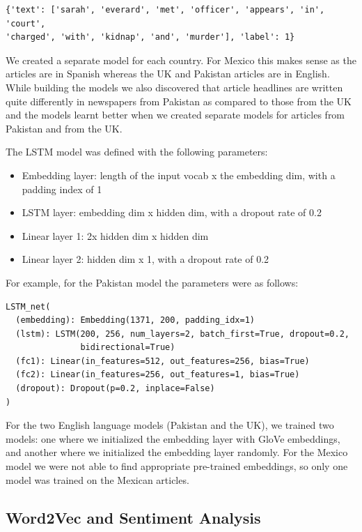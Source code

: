\documentclass{article}
\begin{document}
{{{\begin{verbatim}
{'text': ['sarah', 'everard', 'met', 'officer', 'appears', 'in', 'court',
'charged', 'with', 'kidnap', 'and', 'murder'], 'label': 1}    
\end{verbatim}

We created a separate model for each country. For Mexico this makes sense as the articles are in Spanish whereas the UK and Pakistan articles are in English. While building the models we also discovered that article headlines are written quite differently in newspapers from Pakistan as compared to those from the UK and the models learnt better when we created separate models for articles from Pakistan and from the UK.  

The LSTM model was defined with the following parameters:
\begin{itemize}
  \item Embedding layer: length of the input vocab x the embedding dim, with a padding index of 1
  \item LSTM layer: embedding dim x hidden dim, with a dropout rate of 0.2
  \item Linear layer 1: 2x hidden dim x hidden dim
  \item Linear layer 2: hidden dim x 1, with a dropout rate of 0.2 
\end{itemize}

For example, for the Pakistan model the parameters were as follows:
\begin{verbatim}
LSTM_net(
  (embedding): Embedding(1371, 200, padding_idx=1)
  (lstm): LSTM(200, 256, num_layers=2, batch_first=True, dropout=0.2,
               bidirectional=True)
  (fc1): Linear(in_features=512, out_features=256, bias=True)
  (fc2): Linear(in_features=256, out_features=1, bias=True)
  (dropout): Dropout(p=0.2, inplace=False)
)\end{verbatim}

For the two English language models (Pakistan and the UK), we trained two models: one where we initialized the embedding layer with GloVe embeddings, and another where we initialized the embedding layer randomly. For the Mexico model we were not able to find appropriate pre-trained embeddings, so only one model was trained on the Mexican articles. 
}

}

\subsection{Word2Vec and Sentiment Analysis}{

}}
\end{document}
